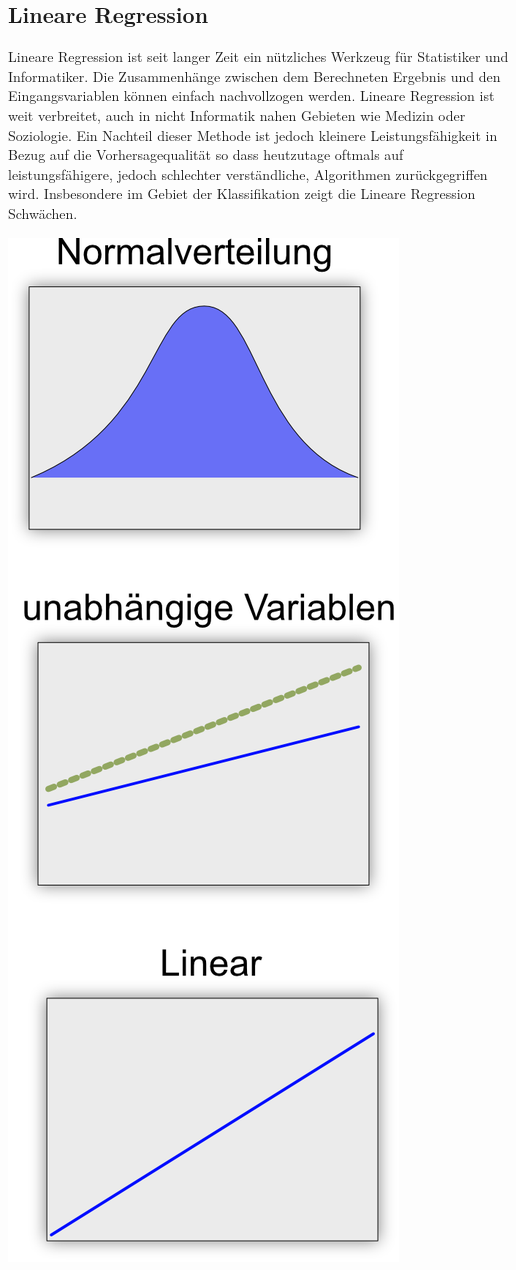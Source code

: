 \documentclass[
  12pt, %
  a4paper, %
  oneside, %
  openany, 
  numbers=noenddot, %
  BCOR=5mm, %
  parskip=half*, %
  thesis, %
]{bfhbook}
\begin{document}
\subsection{Lineare Regression}
Lineare Regression ist seit langer Zeit ein nützliches Werkzeug für Statistiker und Informatiker. Die Zusammenhänge zwischen dem Berechneten Ergebnis und den Eingangsvariablen können einfach nachvollzogen werden. Lineare Regression ist weit verbreitet, auch in nicht Informatik nahen Gebieten wie Medizin oder Soziologie. Ein Nachteil dieser Methode ist jedoch kleinere Leistungsfähigkeit in Bezug auf die Vorhersagequalität so dass heutzutage oftmals auf leistungsfähigere, jedoch schlechter verständliche, Algorithmen zurückgegriffen wird. Insbesondere im Gebiet der Klassifikation zeigt die Lineare Regression Schwächen.

\begin{center}
\begin{minipage}[t]{0.45\linewidth}
\vspace{0pt}
\includegraphics[width=0.6\linewidth]{Bilder/Regressions-Bedingungen.png}

\end{minipage}
\end{center}
\end{document}
